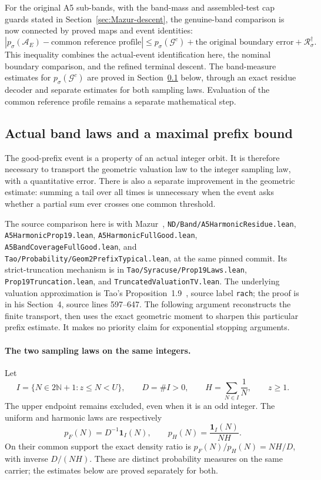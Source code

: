 For the original A5 sub-bands, with the band-mass and assembled-test
cap guards stated in Section~\ref{sec:Mazur-descent}, the genuine-band
comparison is now connected by proved maps and event identities:
\[
 |p_\sigma(\mathcal A_E)-\text{common reference profile}|
 \le p_\sigma(\mathcal G^c)
      +\text{the original boundary error}
      +\mathcal R_\sigma^\dagger .
\]
This inequality combines the actual-event identification here, the
nominal boundary comparison, and the refined terminal descent.
The band-measure estimates for $p_\sigma(\mathcal G^c)$ are proved
in Section~\ref{sec:Mazur-band-fullgood} below, through an exact residue
decoder and separate estimates for both sampling laws. Evaluation of
the common reference profile remains a separate mathematical step.

\subsection{Actual band laws and a maximal prefix bound}
\label{sec:Mazur-band-fullgood}

The good-prefix event is a property of an actual integer orbit. It is
therefore necessary to transport the geometric valuation law to the
integer sampling law, with a quantitative error. There is also a
separate improvement in the geometric estimate: summing a tail over
all times is unnecessary when the event asks whether a partial sum
ever crosses one common threshold.

The source comparison here is with Mazur~\cite{Mazur2026v2},
\texttt{ND/Band/A5HarmonicResidue.lean},
\texttt{A5HarmonicProp19.lean}, \texttt{A5HarmonicFullGood.lean},
\texttt{A5BandCoverageFullGood.lean}, and
\texttt{Tao/Probability/Geom2PrefixTypical.lean}, at the same pinned
commit. Its strict-truncation mechanism is in
\texttt{Tao/Syracuse/Prop19Laws.lean},
\texttt{Prop19Truncation.lean}, and
\texttt{TruncatedValuationTV.lean}.
The underlying valuation approximation is Tao's
Proposition~1.9~\cite{Tao2026v7}, source label \texttt{rach};
the proof is in his Section~4, source lines 597--647.
The following argument reconstructs the finite transport, then uses
the exact geometric moment to sharpen this particular prefix estimate.
It makes no priority claim for exponential stopping arguments.

\paragraph{The two sampling laws on the same integers.}
Let
\[
 I= \{N\in2\mathbb N+1:z\le N<U\},\qquad
 D=\#I>0,\qquad H=\sum_{N\in I}\frac1N,\qquad z\ge1.
\]
The upper endpoint remains excluded, even when it is an odd integer.
The uniform and harmonic laws are respectively
\[
 p_F(N)=D^{-1}\mathbf1_I(N),\qquad
 p_H(N)=\frac{\mathbf1_I(N)}{NH}.
\]
On their common support the exact density ratio is
$p_F(N)/p_H(N)=NH/D$, with inverse $D/(NH)$.
These are distinct probability measures on the same carrier;
the estimates below are proved separately for both.

